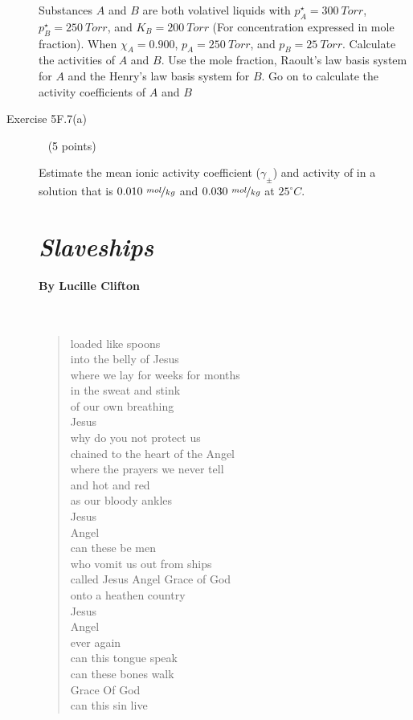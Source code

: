 \documentclass[12pt, openany, letterpaper]{memoir}
\begin{document}
\begin{description}
Substances $A$ and $B$ are both volativel liquids with $p_A^\star=300~Torr$, $p_B^\star=250~Torr$, and $K_B=200~Torr$ (For concentration expressed in mole fraction). When $\chi_A=0.900$, $p_A=250~Torr$, and $p_B=25~Torr$. Calculate the activities of $A$ and $B$. Use the mole fraction, Raoult's law basis system for $A$ and the Henry's law basis system for $B$. Go on to calculate the activity coefficients of $A$ and $B$
	
	\vspace{20em}
	\item [Exercise 5F.7(a)] ~ (5 points)
	
	Estimate the mean ionic activity coefficient ($\gamma_\pm$) and activity of  in a solution that is $0.010~\nicefrac{mol}{kg}$  and $0.030~\nicefrac{mol}{kg}$  at $25^\circ C$.
	
	\vspace{18em}

	
\newpage
\pagestyle{empty}
\addtocounter{page}{-1}	
\section*{\emph{Slaveships}}
\paragraph{By Lucille Clifton}~
\begin{verse}
	loaded like spoons\\
	into the belly of Jesus\\
	where we lay for weeks for months\\
	in the sweat and stink\\
	of our own breathing\\
	Jesus\\
	why do you not protect us\\
	chained to the heart of the Angel\\
	where the prayers we never tell\\
	and hot and red\\
	as our bloody ankles\\
	Jesus\\
	Angel\\
	can these be men\\
	who vomit us out from ships\\
	called Jesus    Angel    Grace of God\\
	onto a heathen country\\
	Jesus\\
	Angel\\
	ever again\\
	can this tongue speak\\
	can these bones walk\\
	Grace Of God\\
	can this sin live
\end{verse}
\end{description}
\end{document}
